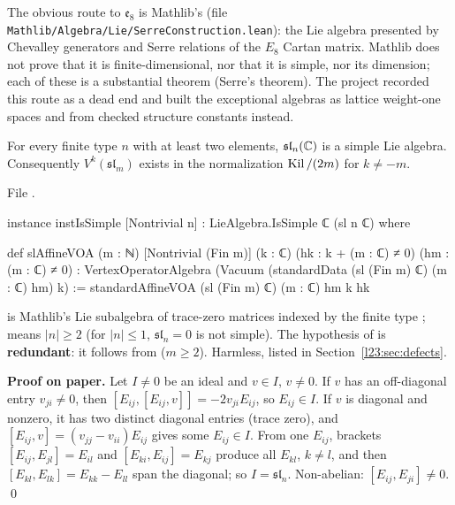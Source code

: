 \begin{warning}[title={Dead end: Mathlib's Serre construction}]\label{l23:warn:serre}
The obvious route to $\mathfrak e_8$ is Mathlib's  (file
\texttt{Mathlib/Algebra/Lie/SerreConstruction.lean}): the Lie algebra presented by Chevalley generators and Serre relations of
the $E_8$ Cartan matrix. Mathlib does not prove that it is finite-dimensional, nor that it is simple, nor its dimension; each
of these is a substantial theorem (Serre's theorem). The project recorded this route as a dead end and
built the exceptional algebras as lattice weight-one spaces and from checked structure constants instead.
\end{warning}

\begin{theorem}\label{l23:thm:sln}
For every finite type $n$ with at least two elements, $\mathfrak{sl}_n({\mathbb{C}})$ is a simple Lie algebra. Consequently
$V^k(\mathfrak{sl}_m)$ exists in the normalization $\operatorname{Kil}/(2m)$ for $k\ne-m$.
\end{theorem}
\noindent File .
\begin{leancode}
instance instIsSimple [Nontrivial n] : LieAlgebra.IsSimple ℂ (sl n ℂ) where

def slAffineVOA (m : ℕ) [Nontrivial (Fin m)] (k : ℂ) (hk : k + (m : ℂ) ≠ 0) (hm : (m : ℂ) ≠ 0) :
    VertexOperatorAlgebra (Vacuum (standardData (sl (Fin m) ℂ) (m : ℂ) hm) k) :=
  standardAffineVOA (sl (Fin m) ℂ) (m : ℂ) hm k hk
\end{leancode}

\begin{dictionary}
 is Mathlib's Lie subalgebra of trace-zero matrices indexed by the finite type ;
\lean{[Nontrivial n]} means $|n|\ge2$ (for $|n|\le1$, $\mathfrak{sl}_n=0$ is not simple). The hypothesis 
of  is \textbf{redundant}: it follows from  ($m\ge2$). Harmless, listed in
Section~\ref{l23:sec:defects}.
\end{dictionary}

\textbf{Proof on paper.} Let $I\ne0$ be an ideal and $v\in I$, $v\ne0$. If $v$ has an off-diagonal entry $v_{ji}\ne0$, then
$[E_{ij},[E_{ij},v]]=-2v_{ji}E_{ij}$, so $E_{ij}\in I$. If $v$ is diagonal and nonzero, it has two distinct diagonal entries (trace
zero), and $[E_{ij},v]=(v_{jj}-v_{ii})E_{ij}$ gives some $E_{ij}\in I$. From one $E_{ij}$, brackets
$[E_{ij},E_{jl}]=E_{il}$ and $[E_{ki},E_{ij}]=E_{kj}$ produce all $E_{kl}$, $k\ne l$, and then $[E_{kl},E_{lk}]=E_{kk}-E_{ll}$ span the
diagonal; so $I=\mathfrak{sl}_n$. Non-abelian: $[E_{ij},E_{ji}]\ne0$. \qed

